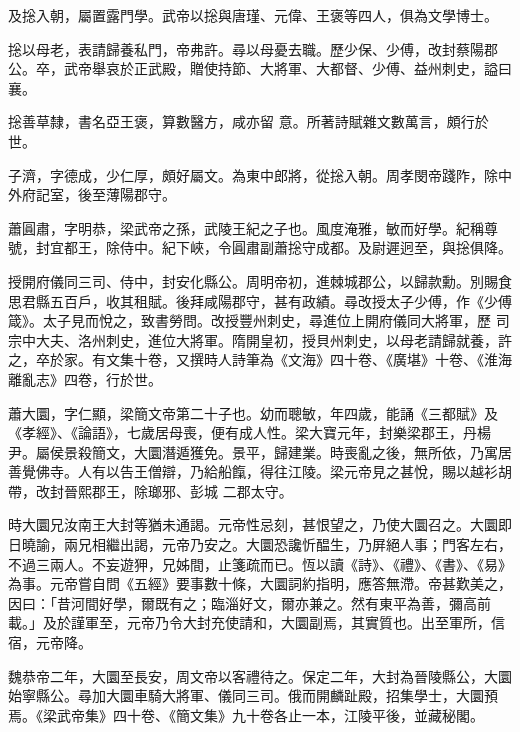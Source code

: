 \begin{pinyinscope}
 及捴入朝，屬置露門學。武帝以捴與唐瑾、元偉、王褒等四人，俱為文學博士。



 捴以母老，表請歸養私門，帝弗許。尋以母憂去職。歷少保、少傅，改封蔡陽郡公。卒，武帝舉哀於正武殿，贈使持節、大將軍、大都督、少傅、益州刺史，謚曰襄。



 捴善草隸，書名亞王褒，算數醫方，咸亦留
 意。所著詩賦雜文數萬言，頗行於世。



 子濟，字德成，少仁厚，頗好屬文。為東中郎將，從捴入朝。周孝閔帝踐阼，除中外府記室，後至薄陽郡守。



 蕭圓肅，字明恭，梁武帝之孫，武陵王紀之子也。風度淹雅，敏而好學。紀稱尊號，封宜都王，除侍中。紀下峽，令圓肅副蕭捴守成都。及尉遲迥至，與捴俱降。



 授開府儀同三司、侍中，封安化縣公。周明帝初，進棘城郡公，以歸款勳。別賜食思君縣五百戶，收其租賦。後拜咸陽郡守，甚有政績。尋改授太子少傅，作《少傅箴》。太子見而悅之，致書勞問。改授豐州刺史，尋進位上開府儀同大將軍，歷
 司宗中大夫、洛州刺史，進位大將軍。隋開皇初，授貝州刺史，以母老請歸就養，許之，卒於家。有文集十卷，又撰時人詩筆為《文海》四十卷、《廣堪》十卷、《淮海離亂志》四卷，行於世。



 蕭大圜，字仁顯，梁簡文帝第二十子也。幼而聰敏，年四歲，能誦《三都賦》及《孝經》、《論語》，七歲居母喪，便有成人性。梁大寶元年，封樂梁郡王，丹楊尹。屬侯景殺簡文，大圜潛遁獲免。景平，歸建業。時喪亂之後，無所依，乃寓居善覺佛寺。人有以告王僧辯，乃給船餼，得往江陵。梁元帝見之甚悅，賜以越衫胡帶，改封晉熙郡王，除瑯邪、彭城
 二郡太守。



 時大圜兄汝南王大封等猶未通謁。元帝性忌刻，甚恨望之，乃使大圜召之。大圜即日曉諭，兩兄相繼出謁，元帝乃安之。大圜恐讒忻醖生，乃屏絕人事；門客左右，不過三兩人。不妄遊狎，兄姊間，止箋疏而已。恆以讀《詩》、《禮》、《書》、《易》為事。元帝嘗自問《五經》要事數十條，大圜詞約指明，應答無滯。帝甚歎美之，因曰：「昔河間好學，爾既有之；臨淄好文，爾亦兼之。然有東平為善，彌高前載。」及於謹軍至，元帝乃令大封充使請和，大圜副焉，其實質也。出至軍所，信宿，元帝降。



 魏恭帝二年，大圜至長安，周文帝以客禮待之。保定二年，大封為晉陵縣公，大圜
 始寧縣公。尋加大圜車騎大將軍、儀同三司。俄而開麟趾殿，招集學士，大圜預焉。《梁武帝集》四十卷、《簡文集》九十卷各止一本，江陵平後，並藏秘閣。




\end{pinyinscope}
